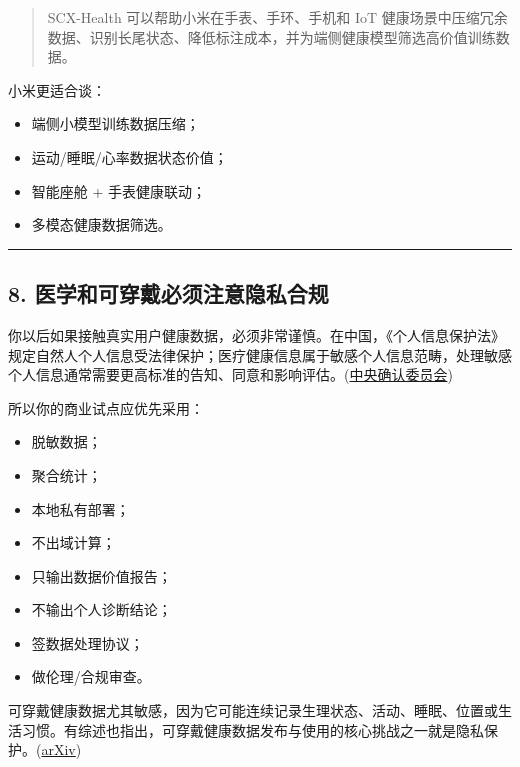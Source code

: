 \documentclass[
  12pt,
]{ctexart}
\providecommand{\tightlist}{%
  \setlength{\itemsep}{0pt}\setlength{\parskip}{0pt}}
\begin{document}
\begin{quote}
SCX-Health 可以帮助小米在手表、手环、手机和 IoT
健康场景中压缩冗余数据、识别长尾状态、降低标注成本，并为端侧健康模型筛选高价值训练数据。
\end{quote}

小米更适合谈：

\begin{itemize}
\tightlist
\item
  端侧小模型训练数据压缩；
\item
  运动/睡眠/心率数据状态价值；
\item
  智能座舱 + 手表健康联动；
\item
  多模态健康数据筛选。
\end{itemize}

\begin{center}\rule{0.5\linewidth}{0.5pt}\end{center}

\subsection{8.
医学和可穿戴必须注意隐私合规}\label{ux533bux5b66ux548cux53efux7a7fux6234ux5fc5ux987bux6ce8ux610fux9690ux79c1ux5408ux89c4}

你以后如果接触真实用户健康数据，必须非常谨慎。在中国，《个人信息保护法》规定自然人个人信息受法律保护；医疗健康信息属于敏感个人信息范畴，处理敏感个人信息通常需要更高标准的告知、同意和影响评估。(\href{https://arxiv.org/abs/2501.07314?utm_source=chatgpt.com}{中央确认委员会})

所以你的商业试点应优先采用：

\begin{itemize}
\tightlist
\item
  脱敏数据；
\item
  聚合统计；
\item
  本地私有部署；
\item
  不出域计算；
\item
  只输出数据价值报告；
\item
  不输出个人诊断结论；
\item
  签数据处理协议；
\item
  做伦理/合规审查。
\end{itemize}

可穿戴健康数据尤其敏感，因为它可能连续记录生理状态、活动、睡眠、位置或生活习惯。有综述也指出，可穿戴健康数据发布与使用的核心挑战之一就是隐私保护。(\href{https://arxiv.org/abs/2505.05427?utm_source=chatgpt.com}{arXiv})
\end{document}
